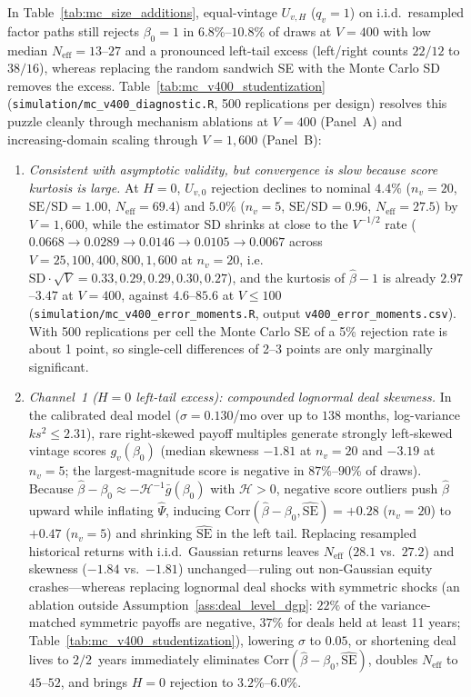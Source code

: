 In Table~\ref{tab:mc_size_additions}, equal-vintage $U_{v,H}$ ($q_v=1$) on i.i.d.\ resampled factor paths still rejects $\beta_0 = 1$ in $6.8\%$--$10.8\%$ of draws at $V = 400$ with low median $N_{\mathrm{eff}} = 13\text{--}27$ and a pronounced left-tail excess (left/right counts $22/12$ to $38/16$), whereas replacing the random sandwich SE with the Monte Carlo SD removes the excess.
Table~\ref{tab:mc_v400_studentization} (\texttt{simulation/mc\_v400\_diagnostic.R}, 500 replications per design) resolves this puzzle cleanly through mechanism ablations at $V=400$ (Panel~A) and increasing-domain scaling through $V=1{,}600$ (Panel~B):
\begin{enumerate}
  \item \emph{Consistent with asymptotic validity, but convergence is slow because score kurtosis is large.} At $H = 0$, $U_{v,0}$ rejection declines to nominal $4.4\%$ ($n_v=20$, $\mathrm{SE}/\mathrm{SD}=1.00$, $N_{\mathrm{eff}}=69.4$) and $5.0\%$ ($n_v=5$, $\mathrm{SE}/\mathrm{SD}=0.96$, $N_{\mathrm{eff}}=27.5$) by $V = 1{,}600$, while the estimator SD shrinks at close to the $V^{-1/2}$ rate ($0.0668 \to 0.0289 \to 0.0146 \to 0.0105 \to 0.0067$ across $V = 25, 100, 400, 800, 1{,}600$ at $n_v=20$, i.e.\ $\mathrm{SD}\cdot\sqrt{V} = 0.33, 0.29, 0.29, 0.30, 0.27$), and the kurtosis of $\hat\beta - 1$ is already $2.97$--$3.47$ at $V=400$, against $4.6$--$85.6$ at $V \le 100$ (\texttt{simulation/mc\_v400\_error\_moments.R}, output \texttt{v400\_error\_moments.csv}). With 500 replications per cell the Monte Carlo SE of a 5\% rejection rate is about 1 point, so single-cell differences of 2--3 points are only marginally significant.
  \item \emph{Channel~1 ($H=0$ left-tail excess): compounded lognormal deal skewness.} In the calibrated deal model ($\sigma = 0.130$/mo over up to $138$ months, log-variance $k s^2 \le 2.31$), rare right-skewed payoff multiples generate strongly left-skewed vintage scores $g_v(\beta_0)$ (median skewness $-1.81$ at $n_v=20$ and $-3.19$ at $n_v=5$; the largest-magnitude score is negative in $87\%$--$90\%$ of draws). Because $\hat\beta - \beta_0 \approx -\mathcal{H}^{-1}\bar g(\beta_0)$ with $\mathcal{H}>0$, negative score outliers push $\hat\beta$ upward while inflating $\hat\Psi$, inducing $\mathrm{Corr}(\hat\beta-\beta_0, \widehat{\mathrm{SE}}) = +0.28$ ($n_v=20$) to $+0.47$ ($n_v=5$) and shrinking $\widehat{\mathrm{SE}}$ in the left tail. Replacing resampled historical returns with i.i.d.\ Gaussian returns leaves $N_{\mathrm{eff}}$ ($28.1$ vs.\ $27.2$) and skewness ($-1.84$ vs.\ $-1.81$) unchanged---ruling out non-Gaussian equity crashes---whereas replacing lognormal deal shocks with symmetric shocks (an ablation outside Assumption~\ref{ass:deal_level_dgp}: $22\%$ of the variance-matched symmetric payoffs are negative, $37\%$ for deals held at least 11 years; Table~\ref{tab:mc_v400_studentization}), lowering $\sigma$ to $0.05$, or shortening deal lives to $2/2$~years immediately eliminates $\mathrm{Corr}(\hat\beta-\beta_0, \widehat{\mathrm{SE}})$, doubles $N_{\mathrm{eff}}$ to $45$--$52$, and brings $H=0$ rejection to $3.2\%$--$6.0\%$.

\end{enumerate}
